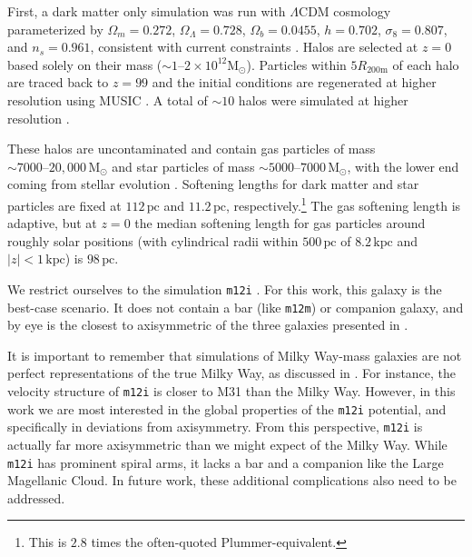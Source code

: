 \documentclass[twocolumn]{aastex62}
\newcommand{\Msun}{\text{M}_\odot}
\newcommand{\pc}{\text{pc}}
\newcommand{\kpc}{\text{kpc}}
\newcommand{\abs}[1]{\left| #1 \right|}
\newcommand{\z}{z}
\begin{document}
First, a dark matter only simulation was run with $\Lambda$CDM cosmology
parameterized by $\Omega_m = 0.272$, $\Omega_{\Lambda} = 0.728$, $\Omega_b =
0.0455$, $h = 0.702$, $\sigma_8 = 0.807$, and $n_s = 0.961$, consistent with
current constraints \citep{2018arXiv180706209P}. Halos are selected at $z=0$
based solely on their mass ($\sim 1\text{--}2 \times 10^{12} \Msun$).
Particles within $5 R_{200\text{m}}$ of each halo are traced back to $\z=99$
and the initial conditions are regenerated at higher resolution using MUSIC
\citep{2011MNRAS.415.2101H}. A total of $\sim 10$ halos were simulated at
higher resolution \citep{2018MNRAS.481.4133G}.

These halos are uncontaminated and contain gas particles of mass $\sim 7000
\text{--} 20,000\,\Msun$ and star particles of mass $\sim 5000 \text{--} 7000\,
\Msun$, with the lower end coming from stellar evolution
\citep{2018arXiv180610564S}. Softening lengths for dark matter and star
particles are fixed at $112\,\pc$ and $11.2\,\pc$,
respectively.\footnote{This is $2.8$ times the often-quoted
Plummer-equivalent.} The gas softening length is adaptive, but at $z=0$ the
median softening length for gas particles around roughly solar positions
(with cylindrical radii within $500\,\pc$ of $8.2\,\kpc$ and
$\abs{z}<1\,\kpc$) is $98\,\pc$.

We restrict ourselves to the simulation \texttt{m12i} \citep[first introduced
in][]{2016ApJ...827L..23W}. For this work, this galaxy is the best-case
scenario. It does not contain a bar (like \texttt{m12m}) or companion galaxy,
and by eye is the closest to axisymmetric of the three galaxies presented in
\citet{2018arXiv180610564S} \citep{2018MNRAS.481.4133G}.

It is important to remember that simulations of Milky Way-mass galaxies are
not perfect representations of the true Milky Way, as discussed in
\citet{2018arXiv180610564S}. For instance, the velocity structure of
\texttt{m12i} is closer to M31 than the Milky Way. However, in this work we
are most interested in the global properties of the \texttt{m12i} potential,
and specifically in deviations from axisymmetry. From this perspective,
\texttt{m12i} is actually far more axisymmetric than we might expect of the
Milky Way. While \texttt{m12i} has prominent spiral arms, it lacks a bar and
a companion like the Large Magellanic Cloud. In future work, these additional
complications also need to be addressed.
\end{document}
